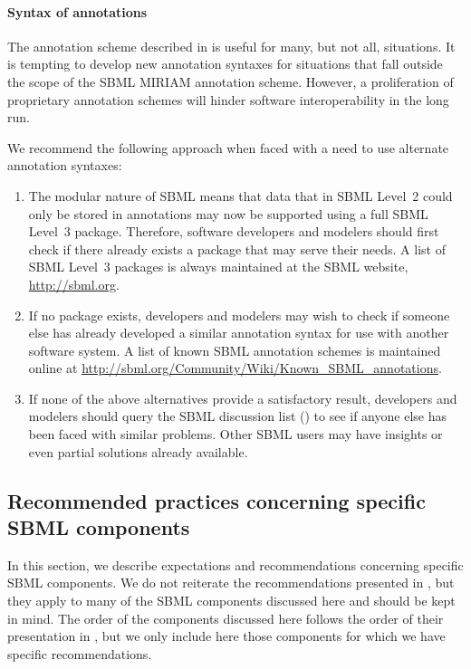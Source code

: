 \paragraph{Syntax of annotations}

The annotation scheme described in
 is useful for many, but not
all, situations.  It is tempting to develop new annotation
syntaxes for situations that fall outside the scope of the SBML
MIRIAM annotation scheme.  However, a proliferation of
proprietary annotation schemes will hinder software
interoperability in the long run.

We recommend the following approach when faced with a need to use
alternate annotation syntaxes:
\begin{enumerate}

\item The modular nature of SBML \thisLV means that data that in
  SBML Level~2 could only be stored in annotations may now be
  supported using a full SBML Level~3 package.  Therefore,
  software developers and modelers should first check if there
  already exists a package that may serve their needs.  A list of
  SBML Level~3 packages is always maintained at the SBML website,
  \url{http://sbml.org}.
  
\item If no package exists, developers and modelers may wish to
  check if someone else has already developed a similar annotation
  syntax for use with another software system.  A list of known
  SBML annotation schemes is maintained online at 
  \url{http://sbml.org/Community/Wiki/Known_SBML_annotations}.

\item If none of the above alternatives provide a satisfactory
  result, developers and modelers should query the SBML discussion
  list ()
  to see if anyone else has been faced with similar problems.
  Other SBML users may have insights or even partial solutions
  already available.

\end{enumerate}


\subsection{Recommended practices concerning specific SBML components}
\label{sec:bp:specifics}

In this section, we describe expectations and recommendations
concerning specific SBML components.  We do not reiterate the
recommendations presented in , but they
apply to many of the SBML components discussed here and should be
kept in mind.  The order of the components discussed here follows
the order of their presentation in , but
we only include here those components for which we have specific
recommendations.


